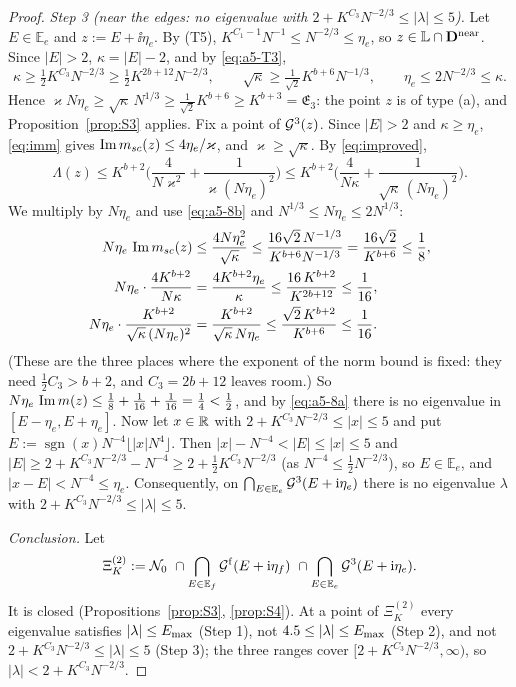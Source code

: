 \begin{proof}
\emph{Step 3 (near the edges: no eigenvalue with $2+K^{C_3}N^{-2/3}\le|\lambda|\le5$).} Let $E\in\mathbb E_e$ and $z:=E+\ii\eta_e$. By (T5), $K^{C_1-1}N^{-1}\le N^{-2/3}\le\eta_e$, so $z\in\mathbb L\cap\mathbf{D}^{\rm near}$. Since $|E|>2$, $\kappa=|E|-2$, and by \eqref{eq:a5-T3},
\begin{equation}\tag{8.b}\label{eq:a5-8b}
 \kappa\ge\tfrac12K^{C_3}N^{-2/3}\ge\tfrac12K^{2b+12}N^{-2/3},\qquad\sqrt\kappa\ge\tfrac1{\sqrt2}K^{b+6}N^{-1/3},\qquad\eta_e\le2N^{-2/3}\le\kappa .
\end{equation}
Hence $\varkappa N\eta_e\ge\sqrt\kappa\,N^{1/3}\ge\frac1{\sqrt2}K^{b+6}\ge K^{b+3}=\mathfrak E_3$: the point $z$ is of type (a), and Proposition~\ref{prop:S3} applies. Fix a point of $\mathcal{G}^3(z)$.
Since $|E|>2$ and $\kappa\ge\eta_e$, \eqref{eq:imm} gives $\operatorname{Im}m_{sc}(z)\le4\eta_e/\varkappa$, and $\varkappa\ge\sqrt\kappa$. By \eqref{eq:improved},
\[
 \Lambda(z)\le K^{b+2}\Big(\frac{4}{N\varkappa^2}+\frac1{\varkappa(N\eta_e)^2}\Big)\le K^{b+2}\Big(\frac{4}{N\kappa}+\frac{1}{\sqrt\kappa\,(N\eta_e)^2}\Big).
\]
We multiply by $N\eta_e$ and use \eqref{eq:a5-8b} and $N^{1/3}\le N\eta_e\le2N^{1/3}$:
\begin{align*}
 N\eta_e\,\operatorname{Im}m_{sc}(z)&\le\frac{4N\eta_e^2}{\sqrt\kappa}\le\frac{16\sqrt2\,N^{-1/3}}{K^{b+6}N^{-1/3}}=\frac{16\sqrt2}{K^{b+6}}\le\frac18,\\
 N\eta_e\cdot\frac{4K^{b+2}}{N\kappa}&=\frac{4K^{b+2}\eta_e}{\kappa}\le\frac{16\,K^{b+2}}{K^{2b+12}}\le\frac1{16},\\
 N\eta_e\cdot\frac{K^{b+2}}{\sqrt\kappa\,(N\eta_e)^2}&=\frac{K^{b+2}}{\sqrt\kappa\,N\eta_e}\le\frac{\sqrt2\,K^{b+2}}{K^{b+6}}\le\frac1{16}.
\end{align*}
(These are the three places where the exponent of the norm bound is fixed: they need $\frac12C_3>b+2$, and $C_3=2b+12$ leaves room.) So $N\eta_e\,\operatorname{Im} m(z)\le\frac18+\frac1{16}+\frac1{16}=\frac14<\frac12$, and by \eqref{eq:a5-8a} there is no eigenvalue in $[E-\eta_e,E+\eta_e]$.
Now let $x\in\mathbb{R}$ with $2+K^{C_3}N^{-2/3}\le|x|\le5$ and put $E:=\operatorname{sgn}(x)N^{-4}\lfloor|x|N^4\rfloor$. Then $|x|-N^{-4}<|E|\le|x|\le5$ and $|E|\ge2+K^{C_3}N^{-2/3}-N^{-4}\ge2+\frac12K^{C_3}N^{-2/3}$ (as $N^{-4}\le\frac12N^{-2/3}$), so
$E\in\mathbb E_e$, and $|x-E|<N^{-4}\le\eta_e$. Consequently, on $\bigcap_{E\in\mathbb E_e}\mathcal{G}^3(E+\mathrm{i}\eta_e)$ there is no eigenvalue $\lambda$ with $2+K^{C_3}N^{-2/3}\le|\lambda|\le5$.

\emph{Conclusion.} Let
\[
 \Xi_K^{(2)}:=\mathcal N_0\ \cap\bigcap_{E\in\mathbb E_f}\cG^{\rm f}(E+\ii\eta_f)\ \cap\bigcap_{E\in\mathbb E_e}\cG^3(E+\ii\eta_e).
\]
It is closed (Propositions~\ref{prop:S3}, \ref{prop:S4}). At a point of $\Xi_K^{(2)}$ every eigenvalue satisfies $|\lambda|\le E_{\max}$ (Step 1), not $4.5\le|\lambda|\le E_{\max}$ (Step 2), and not $2+K^{C_3}N^{-2/3}\le|\lambda|\le5$ (Step 3); the three ranges cover $[2+K^{C_3}N^{-2/3},\infty)$, so $|\lambda|<2+K^{C_3}N^{-2/3}$.


\end{proof}

